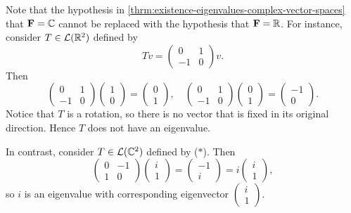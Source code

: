 \begin{example}
Note that the hypothesis in \ref{thrm:existence-eigenvalues-complex-vector-spaces} that $\mathbf F=\mathbb C$ cannot be replaced with the hypothesis that $\mathbf F=\mathbb R$.
For instance, consider $T\in\mathcal{L}(\mathbb R^2)$ defined by
\begin{equation*}\tag{$\ast$}
Tv=\begin{pmatrix}
0&1\\
-1&0
\end{pmatrix}v.
\end{equation*}
Then
\[\begin{pmatrix}
0&1\\
-1&0
\end{pmatrix}\begin{pmatrix}
1\\0
\end{pmatrix}=\begin{pmatrix}
0\\1
\end{pmatrix},\quad
\begin{pmatrix}
0&1\\
-1&0
\end{pmatrix}\begin{pmatrix}
0\\1
\end{pmatrix}=\begin{pmatrix}
-1\\0
\end{pmatrix}.\]
Notice that $T$ is a rotation, so there is no vector that is fixed in its original direction. Hence $T$ does not have an eigenvalue.

In contrast, consider $T\in\mathcal{L}(\mathbb C^2)$ defined by ($\ast$). Then 
\[\begin{pmatrix}
0&-1\\
1&0
\end{pmatrix}\begin{pmatrix}
i\\1
\end{pmatrix}=\begin{pmatrix}
-1\\i
\end{pmatrix}=i\begin{pmatrix}
i\\1
\end{pmatrix},\]
so $i$ is an eigenvalue with corresponding eigenvector $\begin{pmatrix}i\\1\end{pmatrix}$.
\end{example}
\pagebreak

